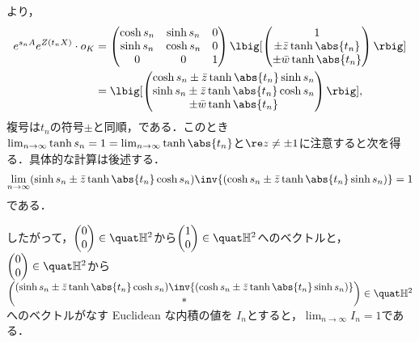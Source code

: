 \begin{pfwn}{}
  より，  
  \begin{align*}
    e^{s_n A}e^{Z(t_n X)}\cdot o_K &=
    \begin{pmatrix}
      \cosh s_n & \sinh s_n & 0 \\
      \sinh s_n & \cosh s_n & 0 \\
      0 & 0 & 1 
    \end{pmatrix}
              \lbig[\begin{pmatrix}
                1\\ \pm \bar{z} \tanh \abs{t_n}  \\ \pm \bar{w} \tanh \abs{t_n}
              \end{pmatrix}\rbig]\\
    &=  \lbig[ \begin{pmatrix}
      \cosh s_n \pm \bar{z} \tanh \abs{t_n} \sinh s_n \\ \sinh s_n \pm \bar{z} \tanh \abs{t_n} \cosh s_n \\ \pm \bar{w} \tanh \abs{t_n}
    \end{pmatrix}\rbig],
  \end{align*}
  複号は$t_n$の符号$\pm$と同順，である．このとき$\lim_{n\to \infty}\tanh s_n = 1 = \lim_{n\to \infty}\tanh \abs{t_n} $と$\re z \neq \pm 1$に注意すると次を得る．具体的な計算は後述する．
  \begin{align}
    \lim_{n\to \infty}(\sinh s_n \pm \bar{z} \tanh \abs{t_n} \cosh s_n)\inv{(\cosh s_n \pm \bar{z} \tanh \abs{t_n} \sinh s_n) } = 1\label{eq:-1}
  \end{align}
  である．

  したがって，$
  \begin{pmatrix}
    0 \\ 0 
  \end{pmatrix}
  \in \quat\mathbb{H}^2 $から$
  \begin{pmatrix}
    1 \\ 0 
  \end{pmatrix}
  \in \quat\mathbb{H}^2 $へのベクトルと，$
  \begin{pmatrix}
    0 \\ 0 
  \end{pmatrix}
  \in \quat\mathbb{H}^2 $から\\
  $ \begin{pmatrix}
    (\sinh s_n \pm \bar{z} \tanh \abs{t_n} \cosh s_n)\inv{(\cosh s_n \pm \bar{z} \tanh \abs{t_n} \sinh s_n) } \\  \ast 
  \end{pmatrix}\in \quat\mathbb{H}^2 $へのベクトルがなす Euclidean な内積の値を $I_n$とすると，$\lim_{n\to \infty}I_n = 1 $である．


\end{pfwn}
